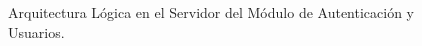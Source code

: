 \begin{figure}[hbtp!]
	\begin{center}
		\caption{Arquitectura Lógica en el Servidor del Módulo de Autenticación y Usuarios.}
		\label{fig:maqservarq}
	\end{center}
\end{figure}

	
